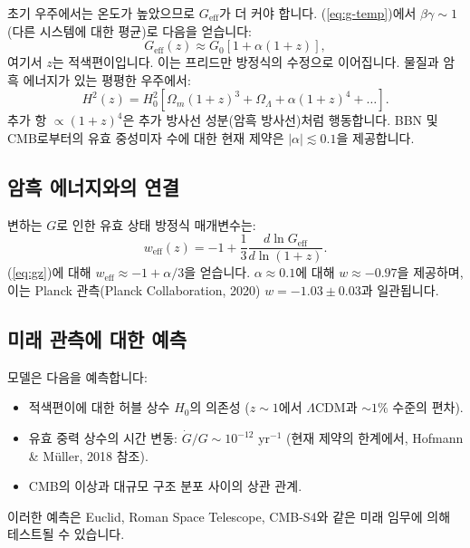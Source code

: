 \documentclass[11pt,a4paper]{article}
\begin{document}
	초기 우주에서는 온도가 높았으므로 $G_{\text{eff}}$가 더 커야 합니다. (\ref{eq:g-temp})에서 $\beta\gamma \sim 1$ (다른 시스템에 대한 평균)로 다음을 얻습니다:
	\begin{equation}
		G_{\text{eff}}(z) \approx G_0 \left[ 1 + \alpha (1+z) \right],
		\label{eq:gz}
	\end{equation}
	여기서 $z$는 적색편이입니다. 이는 프리드만 방정식의 수정으로 이어집니다. 물질과 암흑 에너지가 있는 평평한 우주에서:
	\begin{equation}
		H^2(z) = H_0^2 \left[ \Omega_m (1+z)^3 + \Omega_\Lambda + \alpha (1+z)^4 + \dots \right].
		\label{eq:friedmann}
	\end{equation}
	추가 항 $\propto (1+z)^4$은 추가 방사선 성분(암흑 방사선)처럼 행동합니다. BBN 및 CMB로부터의 유효 중성미자 수에 대한 현재 제약은 $|\alpha| \lesssim 0.1$을 제공합니다.
	
	\subsection{암흑 에너지와의 연결}
	\label{subsec:cosmo-de}
	
	변하는 $G$로 인한 유효 상태 방정식 매개변수는:
	\begin{equation}
		w_{\text{eff}}(z) = -1 + \frac{1}{3} \frac{d \ln G_{\text{eff}}}{d \ln(1+z)}.
		\label{eq:weff}
	\end{equation}
	(\ref{eq:gz})에 대해 $w_{\text{eff}} \approx -1 + \alpha/3$을 얻습니다. $\alpha \approx 0.1$에 대해 $w \approx -0.97$을 제공하며, 이는 Planck 관측(Planck Collaboration, 2020) $w = -1.03 \pm 0.03$과 일관됩니다.
	
	\subsection{미래 관측에 대한 예측}
	\label{subsec:cosmo-predictions}
	
	모델은 다음을 예측합니다:
	\begin{itemize}
		\item 적색편이에 대한 허블 상수 $H_0$의 의존성 ($z\sim 1$에서 $\Lambda$CDM과 $\sim 1\%$ 수준의 편차).
		\item 유효 중력 상수의 시간 변동: $\dot{G}/G \sim 10^{-12}$ yr$^{-1}$ (현재 제약의 한계에서, Hofmann \& Müller, 2018 참조).
		\item CMB의 이상과 대규모 구조 분포 사이의 상관 관계.
	\end{itemize}
	이러한 예측은 Euclid, Roman Space Telescope, CMB-S4와 같은 미래 임무에 의해 테스트될 수 있습니다.
	
\end{document}
